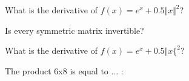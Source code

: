 \documentclass{amsart}
\begin{document}
\begin{category} %
\begin{question}[essay]
What is the derivative of $f(x) = e^x + 0.5 \Vert x \Vert^2$?
\end{question}

\begin{question}[multichoice]
Is every symmetric matrix invertible?
\end{question}

\begin{question}[essay]
What is the derivative of $f(x) = e^x + 0.5 \Vert x \{^2$?
\end{question}
\begin{category}
\begin{question}[multichoice]
The product 6x8 is equal to ... :


\end{question}
\end{category}
\end{category}
\end{document}
